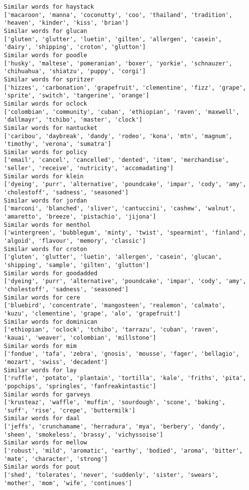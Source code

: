 \documentclass[11pt]{article}
\begin{document}
\begin{Verbatim}[commandchars=\\\{\}]
Similar words for haystack
['macaroon', 'manna', 'coconutty', 'coo', 'thailand', 'tradition', 'heaven', 'kinder', 'kiss', 'brian']
Similar words for glucan
['gluten', 'glutter', 'luetin', 'gilten', 'allergen', 'casein', 'dairy', 'shipping', 'croton', 'glutton']
Similar words for poodle
['husky', 'maltese', 'pomeranian', 'boxer', 'yorkie', 'schnauzer', 'chihuahua', 'shiatzu', 'puppy', 'corgi']
Similar words for spritzer
['hizzes', 'carbonation', 'grapefruit', 'clementine', 'fizz', 'grape', 'sprite', 'switch', 'tangerine', 'orange']
Similar words for oclock
['colombian', 'community', 'cuban', 'ethiopian', 'raven', 'maxwell', 'dallmayr', 'tchibo', 'master', 'clock']
Similar words for nantucket
['caribou', 'daybreak', 'dandy', 'rodeo', 'kona', 'mtn', 'magnum', 'timothy', 'verona', 'sumatra']
Similar words for policy
['email', 'cancel', 'cancelled', 'dented', 'item', 'merchandise', 'seller', 'receive', 'nutricity', 'accomadating']
Similar words for klein
['dyeing', 'purr', 'alternative', 'poundcake', 'impar', 'cody', 'amy', 'cholestoff', 'sadness', 'seasoned']
Similar words for jordan
['marconi', 'blanched', 'sliver', 'cantuccini', 'cashew', 'walnut', 'amaretto', 'breeze', 'pistachio', 'jijona']
Similar words for menthol
['wintergreen', 'bubblegum', 'minty', 'twist', 'spearmint', 'finland', 'algoid', 'flavour', 'memory', 'classic']
Similar words for croton
['gluten', 'glutter', 'luetin', 'allergen', 'casein', 'glucan', 'shipping', 'sample', 'gilten', 'glutton']
Similar words for goodadded
['dyeing', 'purr', 'alternative', 'poundcake', 'impar', 'cody', 'amy', 'cholestoff', 'sadness', 'seasoned']
Similar words for cere
['bluebird', 'concentrate', 'mangosteen', 'realemon', 'calmato', 'kuzu', 'clementine', 'grape', 'alo', 'grapefruit']
Similar words for dominican
['ethiopian', 'oclock', 'tchibo', 'tarrazu', 'cuban', 'raven', 'kauai', 'weaver', 'colombian', 'millstone']
Similar words for mim
['fondue', 'tafa', 'zebra', 'gnosis', 'mousse', 'fager', 'bellagio', 'mozart', 'swiss', 'decadent']
Similar words for lay
['ruffle', 'potato', 'plantain', 'tortilla', 'kale', 'friths', 'pita', 'popchips', 'springles', 'fanfreakintastic']
Similar words for garveys
['krusteaz', 'waffle', 'muffin', 'sourdough', 'scone', 'baking', 'suff', 'rise', 'crepe', 'buttermilk']
Similar words for daal
['jeffs', 'crunchamame', 'herradura', 'mya', 'berbery', 'dandy', 'sheen', 'smokeless', 'brassy', 'vichyssoise']
Similar words for mellow
['robust', 'mild', 'aromatic', 'earthy', 'bodied', 'aroma', 'bitter', 'mate', 'character', 'strong']
Similar words for pout
['shed', 'tolerates', 'never', 'suddenly', 'sister', 'swears', 'mother', 'mom', 'wife', 'continues']

\end{Verbatim}
\end{document}

